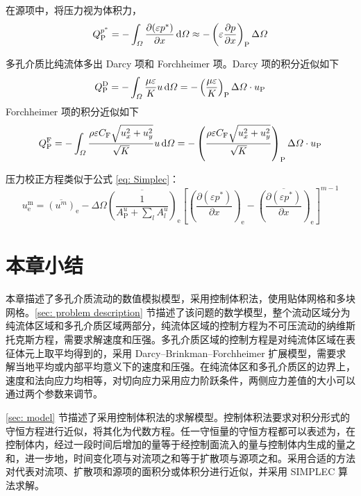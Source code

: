 在源项中，将压力视为体积力，
\begin{equation}
	Q_{\mathrm{P}}^{p^*} = 
	-\int_{\varOmega} \frac{\partial(\varepsilon p^*)}{\partial x} \,\mathrm{d}\varOmega \approx 
	-\left(\varepsilon \frac{\partial p}{\partial x}\right)_{\mathrm{P}} \Delta\varOmega
\end{equation}

多孔介质比纯流体多出 Darcy 项和 Forchheimer 项。Darcy 项的积分近似如下
\begin{equation}
	Q_{\mathrm{P}}^{\mathrm{D}} = 
	-\int_{\varOmega} \frac{\mu\varepsilon}{K}u \,\mathrm{d}\varOmega = 
	-\left(\frac{\mu\varepsilon}{K}\right)_{\mathrm{P}} \Delta\varOmega\cdot u_{\mathrm{P}}
\end{equation}
Forchheimer 项的积分近似如下
\begin{equation}
	Q_{\mathrm{P}}^{\mathrm{F}} = -\int_{\varOmega} \frac{\rho\varepsilon C_{\mathrm{F}}\sqrt{u_x^2+u_y^2}}{\sqrt K} u\,\mathrm{d}\varOmega = -\left(\frac{\rho\varepsilon C_{\mathrm{F}}\sqrt{u_x^2+u_y^2}}{\sqrt K}\right)_{\mathrm{P}} \Delta\varOmega\cdot u_{\mathrm{P}}
\end{equation}

压力校正方程类似于公式 \eqref{eq: Simplec}：
\begin{equation}
	u_{\mathrm{e}}^{\mathrm{m}} = \overline{(u^m)}_{\mathrm{e}} - \Delta\varOmega \overline{\left(\frac{1}{A_{\mathrm{P}}^u+\sum_lA_l^u}\right)}_{\mathrm{e}} \left[\left(\frac{\partial(\varepsilon p^*)}{\partial x}\right)_{\mathrm{e}}-\overline{\left(\frac{\partial(\varepsilon p^*)}{\partial x}\right)}_{\mathrm{e}}\right]^{m-1}
\end{equation}





\section{本章小结}

本章描述了多孔介质流动的数值模拟模型，采用控制体积法，使用贴体网格和多块网格。\ref{sec: problem description} 节描述了该问题的数学模型，整个流动区域分为纯流体区域和多孔介质区域两部分，纯流体区域的控制方程为不可压流动的纳维斯托克斯方程，需要求解速度和压强。多孔介质区域的控制方程是对纯流体区域在表征体元上取平均得到的，采用 Darcy–Brinkman–Forchheimer 扩展模型，需要求解当地平均或内部平均意义下的速度和压强。在纯流体区和多孔介质区的边界上，速度和法向应力均相等，对切向应力采用应力阶跃条件，两侧应力差值的大小可以通过两个参数来调节。

\ref{sec: model} 节描述了采用控制体积法的求解模型。控制体积法要求对积分形式的守恒方程进行近似，将其化为代数方程。任一守恒量的守恒方程都可以表述为，在控制体内，经过一段时间后增加的量等于经控制面流入的量与控制体内生成的量之和，进一步地，时间变化项与对流项之和等于扩散项与源项之和。采用合适的方法对代表对流项、扩散项和源项的面积分或体积分进行近似，并采用 SIMPLEC 算法求解。
